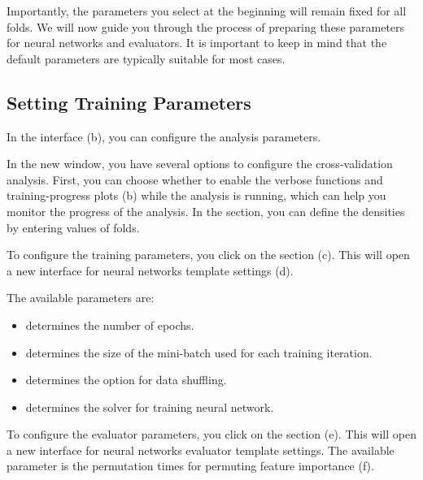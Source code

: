 \documentclass[justified]{tufte-handout}
\begin{document}
{Importantly, the parameters you select at the beginning will remain fixed for all folds. We will now guide you through the process of preparing these parameters for neural networks and evaluators. It is important to keep in mind that the default parameters are typically suitable for most cases.

\subsection{Setting Training Parameters}

In the  interface (b), you can configure the analysis parameters.

In the new window, you have several options to configure the cross-validation analysis. First, you can choose whether to enable the verbose functions and training-progress plots (b) while the analysis is running, which can help you monitor the progress of the analysis. 
In the  section, you can define the densities by entering values of folds.

To configure the training parameters, you click on the section  (c). This will open a new interface for neural networks template settings (d). 

The available parameters are:
\begin{itemize}
	\item {} determines the number of epochs.
	\item {} determines the size of the mini-batch used for each training iteration.
	\item {} determines the option for data shuffling.
	\item {} determines the solver for training neural network.
\end{itemize}

To configure the evaluator parameters, you click on the section  (e). This will open a new interface for neural networks evaluator template settings. 
The available parameter is the permutation times for permuting feature importance (f).


}
\end{document}
